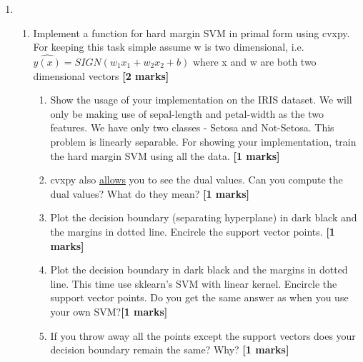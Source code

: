 \documentclass[colorlinks,linkcolor=true]{article}
\begin{document}
\begin{enumerate}


\item \begin{enumerate}
	
\item Implement a function for hard margin SVM in primal form using cvxpy. For keeping this task simple assume w is two dimensional, i.e. $\hat{y(x)} = SIGN(w_1x_1 + w_2x_2 + b)$ where x and w are both two dimensional vectors \textbf{[2 marks]}
\begin{enumerate}
	\item Show the usage of your implementation on the IRIS dataset. We will only be making use of sepal-length and petal-width as the two features. We have only two classes - Setosa and Not-Setosa. This problem is linearly separable. For showing your implementation, train the hard margin SVM using all the data. \textbf{[1 marks]}
	\item cvxpy also \href{https://www.cvxpy.org/tutorial/advanced/index.html}{allows} you to see the dual values. Can you compute the dual values? What do they mean? \textbf{[1 marks]}
	\item Plot the decision boundary (separating hyperplane) in dark black and the margins in dotted line. Encircle the support vector points. \textbf{[1 marks]}
	\item Plot the decision boundary in dark black and the margins in dotted line. This time use sklearn's SVM with linear kernel. Encircle the support vector points. Do you get the same answer as when you use your own SVM?\textbf{[1 marks]}
	\item If you throw away all the points except the support vectors does your decision boundary remain the same? Why? \textbf{[1 marks]}
\end{enumerate}


\end{enumerate}
\end{enumerate}
\end{document}

